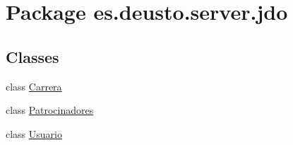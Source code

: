 \hypertarget{namespacees_1_1deusto_1_1server_1_1jdo}{}\section{Package es.\+deusto.\+server.\+jdo}
\label{namespacees_1_1deusto_1_1server_1_1jdo}
\subsection*{Classes}
\begin{DoxyCompactItemize}
\item 
class \mbox{\hyperlink{classes_1_1deusto_1_1server_1_1jdo_1_1_carrera}{Carrera}}
\item 
class \mbox{\hyperlink{classes_1_1deusto_1_1server_1_1jdo_1_1_patrocinadores}{Patrocinadores}}
\item 
class \mbox{\hyperlink{classes_1_1deusto_1_1server_1_1jdo_1_1_usuario}{Usuario}}
\end{DoxyCompactItemize}
